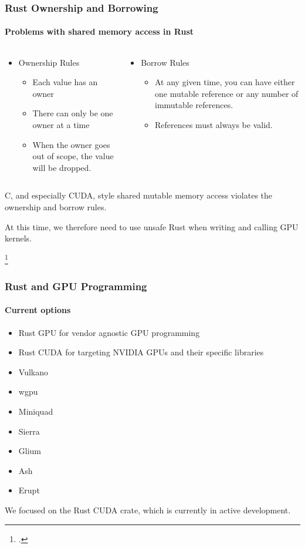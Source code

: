 \documentclass[aspectratio=169]{beamer}
\begin{document}
\begin{frame}
	\frametitle{Rust Ownership and Borrowing}
	\framesubtitle{Problems with shared memory access in Rust}

	\begin{columns}
		\begin{column}{0.5\textwidth}
			\begin{itemize}
				\item Ownership Rules\footnotemark
				      \begin{itemize}
					      \item Each value has an owner
					      \item There can only be one owner at a time
					      \item When the owner goes out of scope, the value will be dropped.
				      \end{itemize}
			\end{itemize}
		\end{column}
		\begin{column}{0.5\textwidth}
			\begin{itemize}
				\item Borrow Rules\footnotemark
				      \begin{itemize}
					      \item At any given time, you can have either one mutable reference or any number of immutable references.
					      \item References must always be valid.
				      \end{itemize}
			\end{itemize}
		\end{column}
	\end{columns}

	\vspace{1cm}
	C, and especially CUDA, style shared mutable memory access violates the ownership and borrow rules.

	At this time, we therefore need to use unsafe Rust when writing and calling GPU kernels.

	\footcitetext[Ch04-02]{rust-book}
\end{frame}

\begin{frame}
	\frametitle{Rust and GPU Programming}
	\framesubtitle{Current options}

	\begin{itemize}
		\item Rust GPU for vendor agnostic GPU programming
		\item Rust CUDA for targeting NVIDIA GPUs and their specific libraries
		\item Vulkano
		\item wgpu
		\item Miniquad
		\item Sierra
		\item Glium
		\item Ash
		\item Erupt
	\end{itemize}

	We focused on the Rust CUDA crate, which is currently in active development.
\end{frame}
\end{document}
